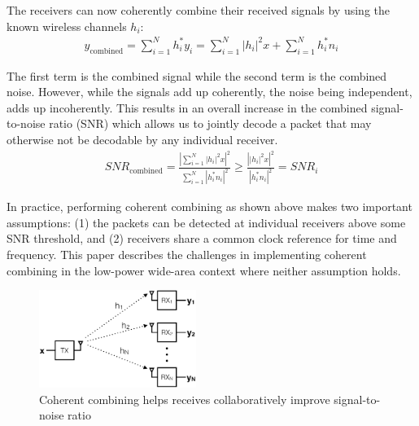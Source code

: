 

The receivers can now coherently combine their received signals by using the known wireless channels $h_i$:
\begin{align*}
y_{\text{combined}}
	= \sum_{i=1}^N h^*_i y_i
	= \sum_{i=1}^N \left| h_i \right|^2 x + \sum_{i=1}^N h^*_i n_i
\end{align*}

The first term is the combined signal while the second term is the combined
noise. However, while the signals add up coherently, the noise being
independent, adds up incoherently.  This results in an overall increase in the
combined signal-to-noise ratio (SNR) which allows us to jointly decode a packet that may otherwise not be decodable by any individual receiver.
\begin{align*}
SNR_{\text{combined}} %
	= \frac{\left| \sum_{i=1}^N \left| h_i \right|^2 x \right|^2}{\sum_{i=1}^N \left| h^*_i n_i \right|^2} 
	\geq \frac{\left| \left| h_i \right|^2 x \right|^2}{\left| h^*_i n_i \right|^2} = SNR_i
\end{align*}

In practice, performing coherent combining as shown above makes two important assumptions: (1) the packets can be detected at individual receivers above some SNR threshold, and (2) receivers share a common clock reference for time and frequency. This paper describes the challenges in implementing coherent combining in the low-power wide-area context where neither assumption holds. 

\begin{figure}[htb]
    \centering
    \includegraphics[height=1.25in]{figures/SIMO_cropped}
    \caption{Coherent combining helps receives collaboratively improve signal-to-noise ratio}
    \label{fig:simo}
    \compactimg
\end{figure}

